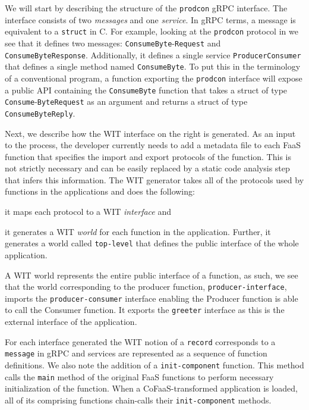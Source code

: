 We will start by describing the structure of the \texttt{prodcon} gRPC interface. The interface consists of two \emph{messages} and one \emph{service}. In gRPC terms, a message is equivalent to a \texttt{struct} in C. For example, looking at the \texttt{prodcon} protocol in  we see that it defines two messages: \texttt{ConsumeByte}-\texttt{Request} and \texttt{ConsumeByteResponse}. Additionally, it defines a single service \texttt{ProducerConsumer} that defines a single method named \texttt{ConsumeByte}. To put this in the terminology of a conventional program, a function exporting the \texttt{prodcon} interface will expose a public API containing the \texttt{ConsumeByte} function that takes a struct of type \texttt{Consume}-\texttt{ByteRequest} as an argument and returns a struct of type \texttt{ConsumeByteReply}.

Next, we describe how the WIT interface on the right is generated. As an input to the process, the developer currently needs to add a metadata file to each FaaS function that specifies the import and export protocols of the function. This is not strictly necessary and can be easily replaced by a static code analysis step that infers this information. The WIT generator takes all of the protocols used by functions in the applications and does the following: \begin{inparaenum}[a)] \item it maps each protocol to a WIT \emph{interface} and \item it generates a WIT \emph{world} for each function in the application. Further, it generates a world called \texttt{top-level} that defines the public interface of the whole application. \end{inparaenum} A WIT world represents the entire public interface of a function, as such, we see that the world corresponding to the producer function, \texttt{producer-interface}, imports the \texttt{producer-consumer} interface enabling the Producer function is able to call the Consumer function. It exports the \texttt{greeter} interface as this is the external interface of the application.

For each interface generated the WIT notion of a \texttt{record} corresponds to a \texttt{message} in gRPC and services are represented as a sequence of function definitions. We also note the addition of a \texttt{init-component} function. This method calls the \texttt{main} method of the original FaaS functions to perform necessary initialization of the function. When a CoFaaS-transformed application is loaded, all of its comprising functions chain-calls their \texttt{init-component} methods.

